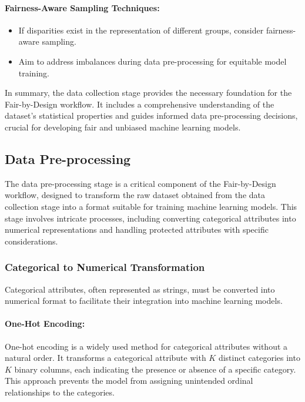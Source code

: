 \paragraph{Fairness-Aware Sampling Techniques:}
\begin{itemize}
    \item If disparities exist in the representation of different groups, consider fairness-aware sampling.
    \item Aim to address imbalances during data pre-processing for equitable model training.
\end{itemize}

In summary, the data collection stage provides the necessary foundation for the Fair-by-Design workflow. It includes a comprehensive understanding of the dataset's statistical properties and guides informed data pre-processing decisions, crucial for developing fair and unbiased machine learning models.

\subsection{Data Pre-processing}
\label{subsection:data_pre_proc}

The data pre-processing stage is a critical component of the Fair-by-Design workflow, designed to transform the raw dataset obtained from the data collection stage into a format suitable for training machine learning models. This stage involves intricate processes, including converting categorical attributes into numerical representations and handling protected attributes with specific considerations.

\subsubsection{Categorical to Numerical Transformation}

Categorical attributes, often represented as strings, must be converted into numerical format to facilitate their integration into machine learning models.

\paragraph{One-Hot Encoding:}
One-hot encoding is a widely used method for categorical attributes without a natural order. It transforms a categorical attribute with \(K\) distinct categories into \(K\) binary columns, each indicating the presence or absence of a specific category. This approach prevents the model from assigning unintended ordinal relationships to the categories.


